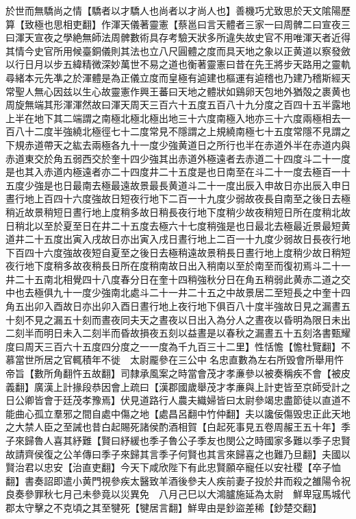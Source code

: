 於世而無驕尚之情【驕者以才驕人也尚者以才尚人也】善機巧尤致思於天文隂陽歷算【致極也思相吏翻】作渾天儀著靈憲【蔡邕曰言天體者三家一曰周髀二曰宣夜三曰渾天宣夜之學絶無師法周髀數術具存考驗天狀多所違失故史官不用唯渾天者近得其情今史官所用候臺銅儀則其法也立八尺圓體之度而具天地之象以正黄道以察發斂以行日月以步五緯精微深妙萬世不易之道也衡著靈憲曰昔在先王將步天路用之靈軌尋緒本元先凖之於渾體是為正儀立度而皇極有逌建也樞運有逌稽也乃建乃稽斯經天常聖人無心因兹以生心故靈憲作興王蕃曰天地之體狀如鷄卵天包地外猶殻之裹黄也周旋無端其形渾渾然故曰渾天周天三百六十五度五百八十九分度之百四十五半露地上半在地下其二端謂之南極北極北極出地三十六度南極入地亦三十六度兩極相去一百八十二度半強繞北極徑七十二度常見不隱謂之上規繞南極七十五度常隱不見謂之下規赤道帶天之紘去兩極各九十一度少強黄道日之所行也半在赤道外半在赤道内與赤道東交於角五弱西交於奎十四少強其出赤道外極遠者去赤道二十四度斗二十一度是也其入赤道内極遠者亦二十四度井二十五度是也日南至在斗二十一度去極百一十五度少強是也日最南去極最遠故景最長黄道斗二十一度出辰入申故日亦出辰入申日晝行地上百四十六度強故日短夜行地下二百一十九度少弱故夜長自南至之後日去極稍近故景稍短日晝行地上度稍多故日稍長夜行地下度稍少故夜稍短日所在度稍北故日稍北以至於夏至日在井二十五度去極六十七度稍強是也日最北去極最近景最短黄道井二十五度出寅入戌故日亦出寅入戌日晝行地上二百一十九度少弱故日長夜行地下百四十六度強故夜短自夏至之後日去極稍遠故景稍長日晝行地上度稍少故日稍短夜行地下度稍多故夜稍長日所在度稍南故日出入稍南以至於南至而復初焉斗二十一井二十五南北相覺四十八度春分日在奎十四稍強秋分日在角五稍弱此黄赤二道之交中也去極俱九十一度少強南北處斗二十一井二十五之中故景居二至短長之中奎十四角五出卯入酉故日亦出卯入酉日晝行地上夜行地下俱百八十度半強故日見之漏晝五十刻不見之漏五十刻而晝夜同夫天之晝夜以日出入為分人之晝夜以昏明為限日未出二刻半而明日未入二刻半而昏故損夜五刻以益晝是以春秋之漏晝五十五刻洛書甄耀度曰周天三百六十五度四分度之一一度為千九百三十二里】性恬憺【憺杜覽翻】不慕當世所居之官輒積年不徙　太尉龎參在三公中名忠直數為左右所毁會所舉用忤帝旨【數所角翻忤五故翻】司隸承風案之時當會茂才孝亷參以被奏稱疾不會【被皮義翻】廣漢上計掾段恭因會上疏曰【漢郡國歲舉茂才孝亷與上計吏皆至京師受計之日公卿皆會于廷茂孝豫焉】伏見道路行人農夫織婦皆曰太尉參竭忠盡節徒以直道不能曲心孤立羣邪之間自處中傷之地【處昌呂翻中竹仲翻】夫以讒佞傷毁忠正此天地之大禁人臣之至誡也昔白起賜死諸侯酌酒相賀【白起死事見五卷周赧王五十年】季子來歸魯人喜其紓難【賢曰紓緩也季子魯公子季友也閔公之時國家多難以季子忠賢故請齊侯復之公羊傳曰季子來歸其言季子何賢也其言來歸喜之也難乃旦翻】夫國以賢治君以忠安【治直吏翻】今天下咸欣陛下有此忠賢願卒寵任以安社稷【卒子恤翻】書奏詔即遣小黄門視參疾太醫致羊酒後參夫人疾前妻子投於井而殺之雒陽令祝良奏參罪秋七月己未參竟以災異免　八月己巳以大鴻臚施延為太尉　鮮卑寇馬城代郡太守擊之不克頃之其至犍死【犍居言翻】鮮卑由是鈔盜差稀【鈔楚交翻】

